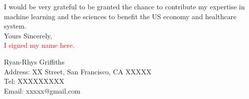 \documentclass[11pt]{article}
\begin{document}
I would be very grateful to be granted the chance to contribute my expertise in machine learning and the sciences to benefit the US economy and healthcare system. \\

Yours Sincerely,\\

\textcolor{red}{I signed my name here.}

\vspace{1.5em}
Ryan-Rhys Griffiths\\

Address: XX Street, San Francisco, CA XXXXX\\
Tel: XXXXXXXXX \\
Email: xxxxx@gmail.com \\


\pagebreak


\renewcommand\refname{List of Exhibits}
\end{document}
